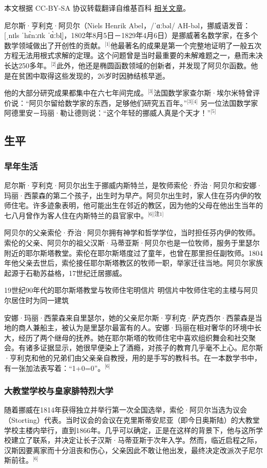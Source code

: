 
本文根据 CC-BY-SA 协议转载翻译自维基百科 \href{https://en.wikipedia.org/wiki/Niels_Henrik_Abel}{相关文章}。

尼尔斯·亨利克·阿贝尔（Niels Henrik Abel，/ˈɑːbəl/ AH-bəl，挪威语发音：[ˌnɪls ˈhɛ̀nːɾɪk ˈɑ̀ːbl̩]，1802年8月5日－1829年4月6日）是挪威著名数学家，在多个数学领域做出了开创性的贡献。\(^\text{[1]}\)他最著名的成果是第一个完整地证明了一般五次方程无法用根式求解的定理。这个问题曾是当时最重要的未解难题之一，悬而未决长达250多年。\(^\text{[2]}\)此外，他还是椭圆函数领域的创新者，并发现了阿贝尔函数。他是在贫困中取得这些发现的，26岁时因肺结核早逝。

他的大部分研究成果都集中在六七年间完成。\(^\text{[3]}\)法国数学家查尔斯·埃尔米特曾评价说：“阿贝尔留给数学家的东西，足够他们研究五百年。”\(^\text{[3][4]}\) 另一位法国数学家阿德里安－玛丽·勒让德则说：“这个年轻的挪威人真是个天才！”\(^\text{[5]}\)
\subsection{生平}
\subsubsection{早年生活}
尼尔斯·亨利克·阿贝尔出生于挪威内斯特兰，是牧师索伦·乔治·阿贝尔和安娜·玛丽·西蒙森的第二个孩子，出生时为早产。阿贝尔出生时，家人住在芬内伊的牧师住宅。许多迹象表明，他可能出生在邻近的教区，因为他的父母在他出生当年的七八月曾作为客人住在内斯特兰的县官家中。\(^\text{[6][注1]}\)

阿贝尔的父亲索伦·乔治·阿贝尔拥有神学和哲学学位，当时担任芬内伊的牧师。索伦的父亲、阿贝尔的祖父汉斯·马蒂亚斯·阿贝尔也是一位牧师，服务于里瑟尔附近的耶尔斯塔教堂。索伦在耶尔斯塔度过了童年，也曾在那里担任副牧师。1804年他父亲去世后，索伦接任耶尔斯塔教区的牧师一职，举家迁往当地。阿贝尔家族起源于石勒苏益格，17世纪迁居挪威。

19世纪90年代的耶尔斯塔教堂与牧师住宅明信片
明信片中牧师住宅的主楼与阿贝尔居住时为同一建筑

安娜·玛丽·西蒙森来自里瑟尔，她的父亲尼尔斯·亨利克·萨克西尔·西蒙森是当地的商人兼船主，被认为是里瑟尔最富有的人。安娜·玛丽在相对奢华的环境中长大，经历了两个继母的抚养。她在耶尔斯塔的牧师住宅中喜欢组织舞会和社交聚会。有诸多证据显示，她很早便染上了酒瘾，对孩子的教育几乎毫不上心。尼尔斯·亨利克和他的兄弟们由父亲亲自教授，用的是手写的教科书。在一本数学书中，有一张加法表写着：“1+0=0”。\(^\text{[6]}\)
\subsubsection{大教堂学校与皇家腓特烈大学}
随着挪威在1814年获得独立并举行第一次全国选举，索伦·阿贝尔当选为议会（Storting）代表。当时议会的会议在克里斯蒂安尼亚（即今日奥斯陆）的大教堂学校主楼内举行，直到1866年。几乎可以确定，正是在这样的背景下，他与这所学校建立了联系，并决定让长子汉斯·马蒂亚斯于次年入学。然而，临近启程之际，汉斯因要离家而十分沮丧和伤心，父亲因此不敢让他出发，最终决定改派次子尼尔斯前往。\(^\text{[6]}\)

